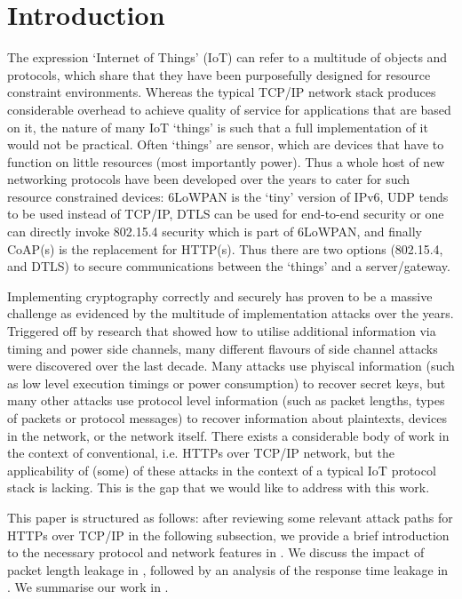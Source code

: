 \documentclass{article}
\begin{document}
\section{Introduction}
The expression `Internet of Things' (IoT) can refer to a multitude of objects and protocols, which share that they have been purposefully designed for resource constraint environments. Whereas the typical TCP/IP network stack produces considerable overhead to achieve quality of service for applications that are based on it, the nature of many IoT `things' is such that a full implementation of it would not be practical. Often `things' are sensor, which are devices that have to function on little resources (most importantly power). Thus a whole host of new networking protocols have been developed over the years to cater for such resource constrained devices: 6LoWPAN is the `tiny' version of IPv6, UDP tends to be used instead of TCP/IP, DTLS can be used for end-to-end security or one can directly invoke 802.15.4 security which is part of 6LoWPAN, and finally CoAP(s) is the replacement for HTTP(s). Thus there are two options (802.15.4, and DTLS) to secure communications between the `things' and a server/gateway. 

Implementing cryptography correctly and securely has proven to be a massive challenge as evidenced by the multitude of implementation attacks over the years. Triggered off by research that showed how to utilise additional information via timing and power side channels\cite{DPA}, many different flavours of side channel attacks were discovered over the last decade. Many attacks use phyiscal information (such as low level execution timings or power consumption) to recover secret keys, but many other attacks use protocol level information (such as packet lengths, types of packets or protocol messages) to recover information about plaintexts, devices in the network, or the network itself. 
There exists a considerable body of work in the context of conventional, i.e. HTTPs over TCP/IP network, but the applicability of (some) of these attacks in the context of a typical IoT protocol stack is lacking. This is the gap that we would like to address with this work. 

This paper is structured as follows: after reviewing some relevant attack paths for HTTPs over TCP/IP in the following subsection, we provide a brief introduction to the necessary protocol and network features in .  We discuss the impact of packet length leakage in , followed by an analysis of the response time leakage in . We summarise our work in . 
\end{document}

